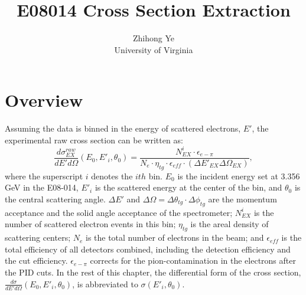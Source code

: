 \documentclass[a4paper,10.5pt]{article}
\title{E08014 Cross Section Extraction}
\author{Zhihong Ye\\ University of Virginia}
\begin{document}
\maketitle
\tableofcontents
\listoffigures

\section{Overview}
 Assuming the data is binned in the energy of scattered electrons, $E'$, the experimental raw cross section can be written as:
\begin{equation}
  \frac{d\sigma^{raw}_{EX}}{dE'd\Omega} (E_{0},E'_{i}, \theta_{0}) = \frac{N^{i}_{EX}\cdot \epsilon_{e-\pi}}{N_{e} \cdot \eta_{tg} \cdot \epsilon_{eff}\cdot (\Delta E'_{EX}\Delta\Omega_{EX})},
  \label{eqxs_org}
\end{equation}
where the superscript $i$ denotes the $ith$ bin. $E_{0}$ is the incident energy set at 3.356 GeV in the E08-014, $E'_{i}$ is the scattered energy at the center of the bin, and $\theta_{0}$ is the central scattering angle. $\Delta E'$ and $\Delta\Omega=\Delta\theta_{tg}\cdot \Delta\phi_{tg}$ are the momentum acceptance and the solid angle acceptance of the spectrometer; $N^{i}_{EX}$ is the number of scattered electron events in this bin; $\eta_{tg}$ is the areal density of scattering centers; $N_{e}$ is the total number of electrons in the beam; and $\epsilon_{eff}$ is the total efficiency of all detectors combined, including the detection efficiency and the cut efficiency. $\epsilon_{e-\pi}$ corrects for the pion-contamination in the electrons after the PID cuts. In the rest of this chapter, the differential form of the cross section, $\frac{d\sigma}{dE'd\Omega}(E_{0},E'_{i}, \theta_{0})$, is abbreviated to $\sigma(E'_{i}, \theta_{0})$.
\end{document}

